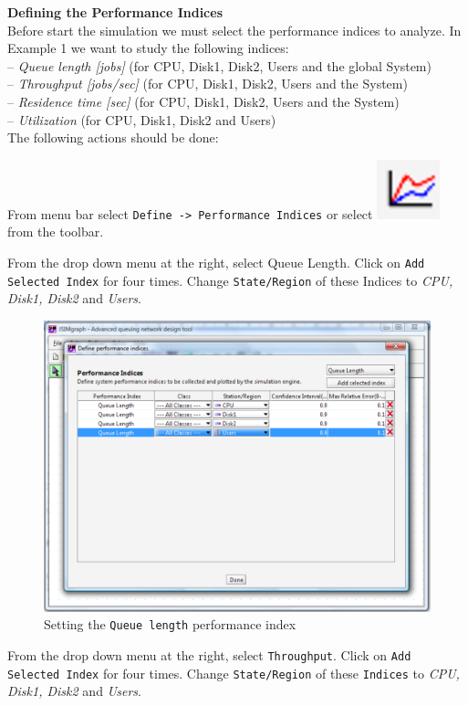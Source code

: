 \noindent \textbf{Defining the Performance Indices}\\
 Before start the
simulation we must select the performance indices to analyze. In
Example 1 we want to study the following
indices:\\
-- \emph{Queue length [jobs]} (for CPU, Disk1, Disk2, Users and
the global System)\\
-- \emph{Throughput [jobs/sec]} (for CPU, Disk1, Disk2, Users and
the System)\\
-- \emph{Residence time [sec]} (for CPU, Disk1, Disk2, Users and
the System)\\
-- \emph{Utilization} (for CPU, Disk1, Disk2 and Users)\\

\noindent The following actions should be done:
\begin{itemize*}
\item From menu bar select \texttt{Define -> Performance Indices}
or select
\includegraphics[scale=.5]{img/jsimg/defineperformanceindices.eps}
from the toolbar. \item From the drop down menu at the right,
select Queue Length. Click on \texttt{Add Selected Index} for four
times. Change \texttt{State/Region} of these Indices to \emph{CPU,
Disk1, Disk2} and \emph{Users}.
\begin{figure}[htb]
    \begin{center}
        \includegraphics[scale=.5]{img/jsimg/12.11.eps}
    \end{center}
    \caption{Setting the \texttt{Queue length} performance index}
    \label{fig:qlperfind}
\end{figure}
\item From the drop down menu at the right, select
\texttt{Throughput}. Click on \texttt{Add Selected Index} for four
times. Change \texttt{State/Region} of these \texttt{Indices} to
\emph{CPU, Disk1, Disk2} and \emph{Users}.


\end{itemize*}

